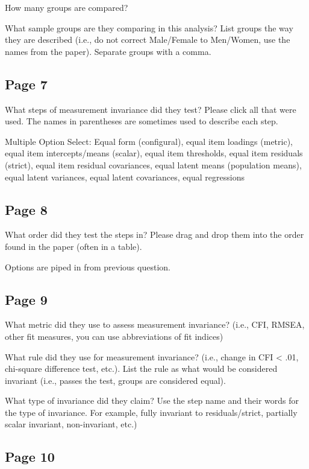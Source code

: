 \documentclass[
  man]{apa7}
\begin{document}
How many groups are compared?

What sample groups are they comparing in this analysis? List groups the way they are described (i.e., do not correct Male/Female to Men/Women, use the names from the paper). Separate groups with a comma.

\hypertarget{page-7}{%
\subsection{Page 7}\label{page-7}}

What steps of measurement invariance did they test? Please click all that were used. The names in parentheses are sometimes used to describe each step.

Multiple Option Select: Equal form (configural), equal item loadings (metric), equal item intercepts/means (scalar), equal item thresholds, equal item residuals (strict), equal item residual covariances, equal latent means (population means), equal latent variances, equal latent covariances, equal regressions

\hypertarget{page-8}{%
\subsection{Page 8}\label{page-8}}

What order did they test the steps in? Please drag and drop them into the order found in the paper (often in a table).

Options are piped in from previous question.

\hypertarget{page-9}{%
\subsection{Page 9}\label{page-9}}

What metric did they use to assess measurement invariance? (i.e., CFI, RMSEA, other fit measures, you can use abbreviations of fit indices)

What rule did they use for measurement invariance? (i.e., change in CFI \textless{} .01, chi-square difference test, etc.). List the rule as what would be considered invariant (i.e., passes the test, groups are considered equal).

What type of invariance did they claim? Use the step name and their words for the type of invariance. For example, fully invariant to residuals/strict, partially scalar invariant, non-invariant, etc.)

\hypertarget{page-10}{%
\subsection{Page 10}\label{page-10}}
\end{document}
